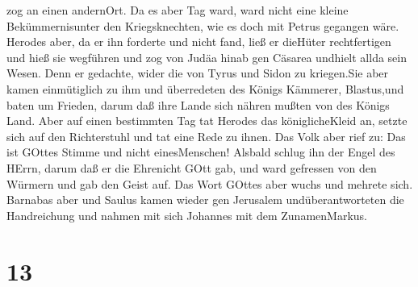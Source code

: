 zog an einen andernOrt.  Da es aber Tag ward, ward nicht
eine kleine Bekümmernisunter den Kriegsknechten, wie es doch mit Petrus
gegangen wäre.  Herodes aber, da er ihn forderte und nicht
fand, ließ er dieHüter rechtfertigen und hieß sie wegführen und zog von
Judäa hinab gen Cäsarea undhielt allda sein Wesen.  Denn er
gedachte, wider die von Tyrus und Sidon zu kriegen.Sie aber kamen
einmütiglich zu ihm und überredeten des Königs Kämmerer, Blastus,und
baten um Frieden, darum daß ihre Lande sich nähren mußten von des Königs
Land.  Aber auf einen bestimmten Tag tat Herodes das
königlicheKleid an, setzte sich auf den Richterstuhl und tat eine Rede
zu ihnen.  Das Volk aber rief zu: Das ist GOttes Stimme und
nicht einesMenschen!  Alsbald schlug ihn der Engel des
HErrn, darum daß er die Ehrenicht GOtt gab, und ward gefressen von den
Würmern und gab den Geist auf.  Das Wort GOttes aber wuchs
und mehrete sich.  Barnabas aber und Saulus kamen wieder
gen Jerusalem undüberantworteten die Handreichung und nahmen mit sich
Johannes mit dem ZunamenMarkus.

\hypertarget{section-12}{%
\section{13}\label{section-12}}

